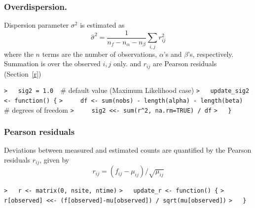 \documentclass[a4paper]{article}
\begin{document}
\subsubsection{Overdispersion. \label{sig2}}
Dispersion parameter $\sigma^2$ is estimated as
\begin{equation}
  \hat{\sigma}^2 = \frac{1}{n_f - n_\alpha - n_\beta} \sum_{i,j} r_{ij}^2
\end{equation}
where the $n$ terms are the number of observations, $\alpha$'s and $\beta$'s, respectively.
Summation is over the observed $i,j$ only.
and $r_{ij}$ are Pearson residuals (Section~\ref{r})\par
\verb~>   sig2 = 1.0  ~{\sffamily\# default value (Maximum Likelihood case)}\newline
\verb~>   update_sig2 <- function() {~\newline
\verb~>     df <- sum(nobs) - length(alpha) - length(beta)  ~{\sffamily\# degrees of freedom}\newline
\verb~>     sig2 <<- sum(r^2, na.rm=TRUE) / df~\newline
\verb~>   }~\par



\subsubsection{Pearson residuals\label{r}}
Deviations between measured and estimated counts are quantified by the
Pearson residuals $r_{ij}$, given by
\begin{equation}
  r_{ij} = (f_{ij} - \mu_{ij}) / \sqrt{\mu_{ij}}
\end{equation}\par
\verb~>   r <- matrix(0, nsite, ntime)~\newline
\verb~>   update_r <- function() {~\newline
\verb~>     r[observed] <<- (f[observed]-mu[observed]) / sqrt(mu[observed])~\newline
\verb~>   }~\par
\end{document}
